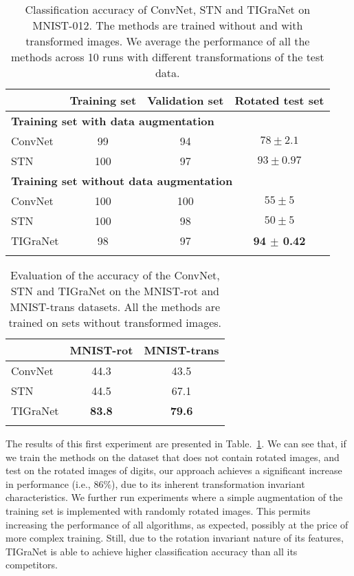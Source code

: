 \documentclass[10pt,journal,compsoc]{IEEEtran}
\begin{document}
	\begin{table}[t!]
		\centering
		\begin{tabularx}{\linewidth}{ X c c c }
			\toprule
			& \scriptsize{Training set} & \scriptsize{Validation set}  & \scriptsize{Rotated test set} \\
			\midrule
			\multicolumn{4}{l}{\scriptsize{\bf{Training set with data augmentation}}}\\
			\qquad ConvNet &  99  &  94 &  $ 78 \pm 2.1$   \\
			\qquad STN & 100  &  97 & $ 93 \pm 0.97$   \\
			\midrule
			\multicolumn{4}{l}{\scriptsize{\bf{Training set without data augmentation}}}\\
			\qquad ConvNet & 100  &  100 &  $ 55 \pm 5$   \\
			\qquad STN & 100  &  98 & $ 50 \pm 5$   \\
			\qquad  TIGraNet & 98  &  97 & \bf{ 94 $\pm$ 0.42 }   \\
			\bottomrule
			\\
		\end{tabularx}
		\caption{Classification accuracy of ConvNet, STN and TIGraNet on MNIST-012. The methods are trained without and with transformed images. We average the performance of all the methods across 10 runs with different transformations of the test data.}
		\label{tab:comparison}
	\end{table}
	\begin{table}[t!]
		\centering
		\begin{tabularx}{\linewidth}{ X c c }
			\toprule
			& \scriptsize{MNIST-rot} & \scriptsize{MNIST-trans} \\
			\midrule
			\qquad ConvNet & 44.3 & 43.5  \\
			\qquad STN &  44.5 & 67.1 \\
			\qquad TIGraNet &  \bf{83.8} & \bf{79.6} \\
			\bottomrule
			\\
		\end{tabularx}
		\caption{Evaluation of the accuracy of the ConvNet, STN and TIGraNet on the MNIST-rot and MNIST-trans datasets. All the methods are trained on sets without transformed images.}
		\label{tab:all_digit}
	\end{table}

	The results of this first experiment are presented in Table.~\ref{tab:comparison}. We can see that, if we train the methods on the dataset that does not contain rotated images, and test on the rotated images of digits, our approach achieves a significant increase in performance (i.e., $86\%$), due to its inherent transformation invariant characteristics. We further run experiments where a simple augmentation of the training set is implemented with randomly rotated images. This permits increasing the performance of all algorithms, as expected, possibly at the price of more complex training. Still, due to the rotation invariant nature of its features, TIGraNet is able to achieve higher classification accuracy than all its competitors.
\end{document}
